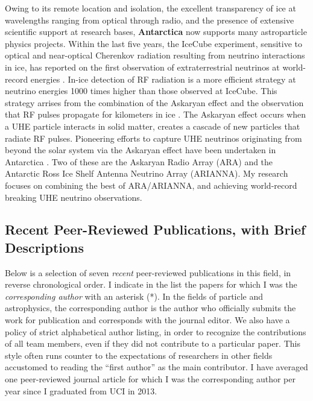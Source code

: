 \documentclass[../../main.tex]{subfiles}
\begin{document}
Owing to its remote location and isolation, the excellent transparency of ice at wavelengths ranging from optical through radio, and the presence of extensive scientific support at research bases, \textbf{Antarctica} now supports many astroparticle physics projects.  Within the last five years,  the IceCube experiment, sensitive to optical and near-optical Cherenkov radiation resulting from neutrino interactions in ice, has reported on the first observation of extraterrestrial neutrinos at world-record energies \cite{Aartsen:2016xlq}.  In-ice detection of RF radiation is a more efficient strategy at neutrino energies 1000 times higher than those observed at IceCube. This strategy arrises from the combination of the Askaryan effect \cite{Askaryan:1962hbi,1962JPSJS..17C.257A,1965JETP...21..658A} and the observation that RF pulses propagate for kilometers in ice \cite{barrella_barwick_saltzberg_2011,barwick_besson_gorham_saltzberg_2005}.  The Askaryan effect occurs when a UHE particle interacts in solid matter, creates a cascade of new particles that radiate RF pulses.  Pioneering efforts to capture UHE neutrinos originating from beyond the solar system via the Askaryan effect have been undertaken in Antarctica \cite{Allison:2015eky,Barwick:2014pca,Gorham:2008dv,Kravchenko:2001id}.  Two of these are the Askaryan Radio Array (ARA) and the Antarctic Ross Ice Shelf Antenna Neutrino Array (ARIANNA).  My research focuses on combining the best of ARA/ARIANNA, and achieving world-record breaking UHE neutrino observations.

\subsection{Recent Peer-Reviewed Publications, with Brief Descriptions}

Below is a selection of seven \textit{recent} peer-reviewed publications in this field, in reverse chronological order.  I indicate in the list the papers for which I was the  \textit{corresponding author} with an asterisk (*).  In the fields of particle and astrophysics, the corresponding author is the author who officially submits the work for publication and corresponds with the journal editor.  We also have a policy of strict alphabetical author listing, in order to recognize the contributions of all team members, even if they did not contribute to a particular paper.  This style often runs counter to the expectations of researchers in other fields accustomed to reading the ``first author'' as the main contributor.  I have averaged one peer-reviewed journal article for which I was the corresponding author per year since I graduated from UCI in 2013. \\ \hspace{0.1cm}
\end{document}

